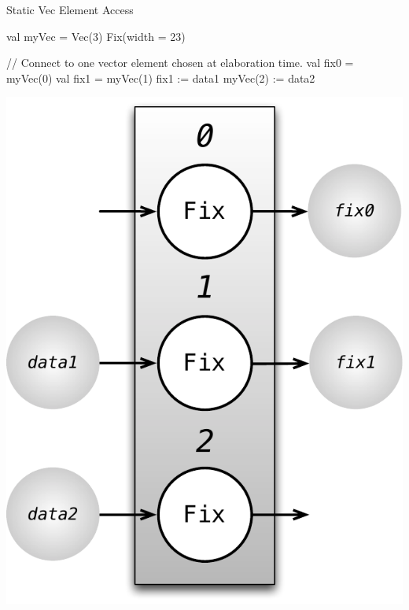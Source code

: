 \documentclass[xcolor=pdflatex,dvipsnames,table]{beamer}
\begin{document}
\begin{frame}[fragile]{Static Vec Element Access}
\begin{scala}
val myVec = Vec(3) { Fix(width = 23) } 

// Connect to one vector element chosen at elaboration time.
val fix0  = myVec(0)
val fix1  = myVec(1)
fix1     := data1 
myVec(2) := data2
\end{scala}

\begin{center}
\includegraphics[height=0.5\textheight]{figs/vec-3-static.pdf} 
\end{center}
\end{frame}
\end{document}
